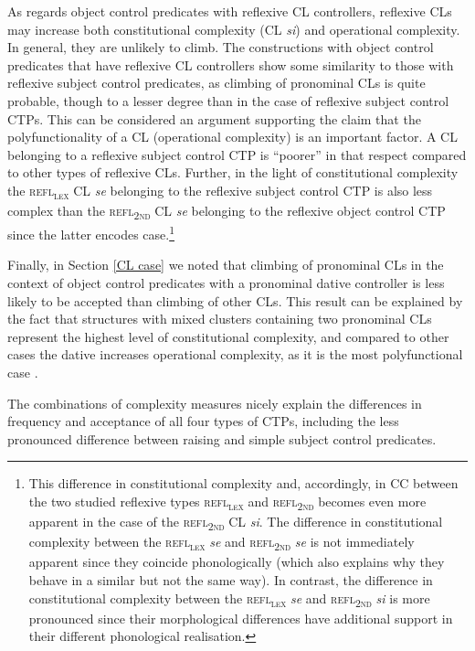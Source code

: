 As regards object control predicates with reflexive CL controllers, reflexive CLs may increase both constitutional complexity (CL \textit{si}) and operational complexity. In general, they are unlikely to climb. The constructions with object control predicates that have reflexive CL controllers show some similarity to those with reflexive subject control predicates, as climbing of pronominal CLs is quite probable, though to a lesser degree than in the case of reflexive subject control CTPs. This can be considered an argument supporting the claim that the polyfunctionality of a CL (operational complexity) is an important factor. A CL belonging to a reflexive subject control CTP is “poorer” in that respect compared to other types of reflexive CLs. Further, in the light of constitutional complexity the \textsc{refl\textsubscript{lex}} CL \textit{se} belonging to the reflexive subject control CTP is also less complex than the \textsc{refl\textsubscript{2nd}} CL \textit{se} belonging to the reflexive object control CTP since the latter encodes case.\footnote{This difference in constitutional complexity and, accordingly, in CC between the two studied reflexive types \textsc{refl\textsubscript{lex}} and \textsc{refl\textsubscript{2nd}} becomes even more apparent in the case of the \textsc{refl\textsubscript{2nd}} CL \textit{si}. The difference in constitutional complexity between the \textsc{refl\textsubscript{lex}} \textit{se} and \textsc{refl\textsubscript{2nd}} \textit{se} is not immediately apparent since they coincide phonologically (which also explains why they behave in a similar but not the same way). In contrast, the difference in constitutional complexity between the \textsc{refl\textsubscript{lex}} \textit{se} and \textsc{refl\textsubscript{2nd}} \textit{si} is more pronounced since their morphological differences have additional support in their different phonological realisation. }

Finally, in Section \ref{CL case} we noted that climbing of pronominal CLs in the context of object control predicates with a pronominal dative controller is less likely to be accepted than climbing of other CLs. This result can be explained by the fact that structures with mixed clusters containing two pronominal CLs represent the highest level of constitutional complexity, and compared to other cases the dative increases operational complexity, as it is the most polyfunctional case \citep[cf.][219f, 223]{SilicPranjkovic07}. 

The combinations of complexity measures nicely explain the differences in frequency and acceptance of all four types of CTPs, including the less pronounced difference between raising and simple subject control predicates. 

